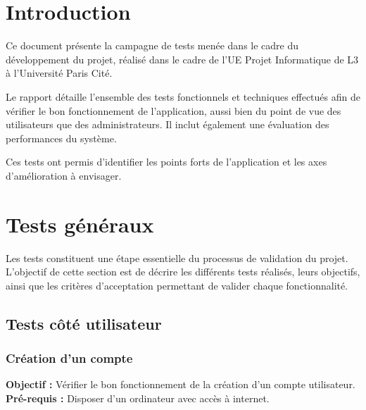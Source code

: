 \documentclass[12pt, a4paper]{article}
\begin{document}
\makecoverpage
\makesommaire

\section{Introduction}

Ce document présente la campagne de tests menée dans le cadre du développement
du projet, réalisé dans le cadre de l'UE Projet Informatique de L3 à l'Université
Paris Cité.

Le rapport détaille l'ensemble des tests fonctionnels et techniques effectués
afin de vérifier le bon fonctionnement de l'application, aussi bien du point de
vue des utilisateurs que des administrateurs. Il inclut également une évaluation
des performances du système.

Ces tests ont permis d'identifier les points forts de l'application et les axes
d'amélioration à envisager.

\section{Tests généraux}

Les tests constituent une étape essentielle du processus de validation du projet.
L'objectif de cette section est de décrire les différents tests réalisés, leurs
objectifs, ainsi que les critères d'acceptation permettant de valider chaque
fonctionnalité.

\subsection{Tests côté utilisateur}

\subsubsection{Création d'un compte}

\noindent\textbf{Objectif :} Vérifier le bon fonctionnement de la création d'un compte utilisateur.\\
\textbf{Pré-requis :} Disposer d'un ordinateur avec accès à internet.
\end{document}
